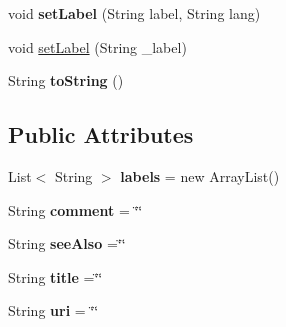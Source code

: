 \begin{DoxyCompactItemize}
\item 
\hypertarget{classodrlmodel_1_1_metadata_object_ad5071d997969db8259edba95f1294f5f}{void {\bfseries set\-Label} (String label, String lang)}\label{classodrlmodel_1_1_metadata_object_ad5071d997969db8259edba95f1294f5f}

\item 
void \hyperlink{classodrlmodel_1_1_metadata_object_a30068a55df0f1053d2e87034f4df574c}{set\-Label} (String \-\_\-label)
\item 
\hypertarget{classodrlmodel_1_1_metadata_object_abaeaaaec78acb676059860c8d22fddfe}{String {\bfseries to\-String} ()}\label{classodrlmodel_1_1_metadata_object_abaeaaaec78acb676059860c8d22fddfe}

\end{DoxyCompactItemize}
\subsection*{Public Attributes}
\begin{DoxyCompactItemize}
\item 
\hypertarget{classodrlmodel_1_1_metadata_object_af0b003dcdfab5da58d765cb0f29a5e77}{List$<$ String $>$ {\bfseries labels} = new Array\-List()}\label{classodrlmodel_1_1_metadata_object_af0b003dcdfab5da58d765cb0f29a5e77}

\item 
\hypertarget{classodrlmodel_1_1_metadata_object_a02b33ee9f1d16129a719bb4d03d0cad6}{String {\bfseries comment} = \char`\"{}\char`\"{}}\label{classodrlmodel_1_1_metadata_object_a02b33ee9f1d16129a719bb4d03d0cad6}

\item 
\hypertarget{classodrlmodel_1_1_metadata_object_a81139568d5481c6045d70714ca4579de}{String {\bfseries see\-Also} =\char`\"{}\char`\"{}}\label{classodrlmodel_1_1_metadata_object_a81139568d5481c6045d70714ca4579de}

\item 
\hypertarget{classodrlmodel_1_1_metadata_object_a3a02e335a5d022de19642dee1c5cd36c}{String {\bfseries title} =\char`\"{}\char`\"{}}\label{classodrlmodel_1_1_metadata_object_a3a02e335a5d022de19642dee1c5cd36c}

\item 
\hypertarget{classodrlmodel_1_1_metadata_object_ab58ebe845c20e917b41b840d4a773683}{String {\bfseries uri} = \char`\"{}\char`\"{}}\label{classodrlmodel_1_1_metadata_object_ab58ebe845c20e917b41b840d4a773683}

\end{DoxyCompactItemize}
